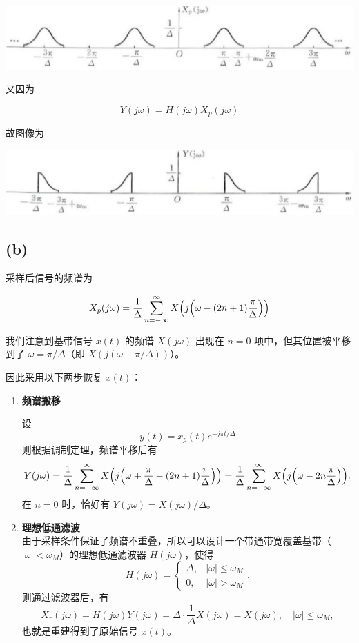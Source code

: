 \documentclass[11pt]{article}
\newcommand{\pandocbounded}[1]{#1} %
\begin{document}
\pandocbounded{\includegraphics[keepaspectratio]{fig/fig3.png}}

又因为

\[
Y(j\omega) = H(j\omega)X_p(j\omega)
\]

故图像为

\pandocbounded{\includegraphics[keepaspectratio]{fig/fig4.png}}

    \subsection{(b)}\label{b}

采样后信号的频谱为

\[
X_p(j\omega)=\frac{1}{\Delta}\sum_{n=-\infty}^{\infty}X\Bigl(j\Bigl(\omega-(2n+1)\frac{\pi}{\Delta}\Bigr)\Bigr)
\]

我们注意到基带信号 \(x(t)\) 的频谱 \(X(j\omega)\) 出现在 \(n=0\)
项中，但其位置被平移到了 \(\omega=\pi/\Delta\)（即
\(X(j(\omega-\pi/\Delta) )\)）。

因此采用以下两步恢复 \(x(t)\)：

\begin{enumerate}
\def\labelenumi{\arabic{enumi}.}
\item
  \textbf{频谱搬移}

  设\\
  \[
  y(t)= x_p(t)e^{-j\pi t/\Delta}
  \] 则根据调制定理，频谱平移后有\\
  \[
  Y(j\omega)=\frac{1}{\Delta}\sum_{n=-\infty}^{\infty}X\Bigl(j\Bigl(\omega+ \frac{\pi}{\Delta}-(2n+1)\frac{\pi}{\Delta}\Bigr)\Bigr)
  =\frac{1}{\Delta}\sum_{n=-\infty}^{\infty}X\Bigl(j\Bigl(\omega-2n\frac{\pi}{\Delta}\Bigr)\Bigr).
  \] 在 \(n=0\) 时，恰好有 \(Y(jω)=X(jω)/Δ\)。
\item
  \textbf{理想低通滤波}\\
  由于采样条件保证了频谱不重叠，所以可以设计一个带通带宽覆盖基带（\(|\omega|<\omega_M\)）的理想低通滤波器
  \(H(j\omega)\)，使得\\
  \[
  H(j\omega)=\begin{cases} \Delta, & |\omega|\le \omega_M \\ 0, & |\omega|>\omega_M \end{cases}.
  \] 则通过滤波器后，有\\
  \[
  X_r(j\omega)=H(j\omega)Y(j\omega)=\Delta\cdot \frac{1}{\Delta}X(j\omega)=X(j\omega),\quad |\omega|\le\omega_M,
  \] 也就是重建得到了原始信号 \(x(t)\)。
\end{enumerate}
\end{document}

